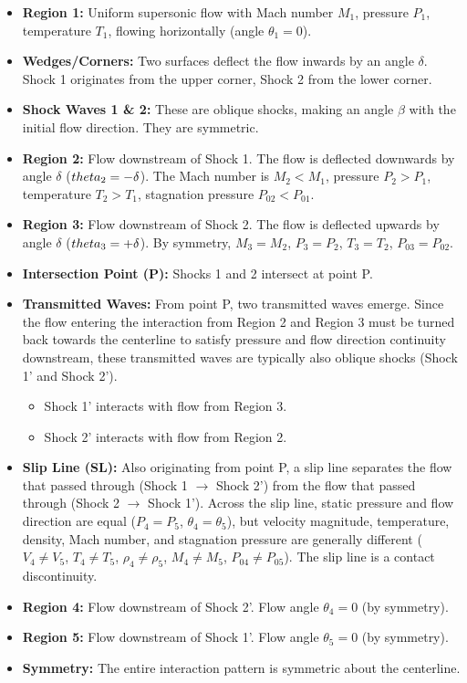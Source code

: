 \begin{itemize}
\tightlist
\item
  \textbf{Region 1:} Uniform supersonic flow with Mach number \(M_1\),
  pressure \(P_1\), temperature \(T_1\), flowing horizontally (angle
  \(\theta_1 = 0\)).
\item
  \textbf{Wedges/Corners:} Two surfaces deflect the flow inwards by an
  angle \(\delta\). Shock 1 originates from the upper corner, Shock 2
  from the lower corner.
\item
  \textbf{Shock Waves 1 \& 2:} These are oblique shocks, making an angle
  \(\beta\) with the initial flow direction. They are symmetric.
\item
  \textbf{Region 2:} Flow downstream of Shock 1. The flow is deflected
  downwards by angle \(\delta\) (\(\\theta_2 = -\delta\)). The Mach
  number is \(M_2 < M_1\), pressure \(P_2 > P_1\), temperature
  \(T_2 > T_1\), stagnation pressure \(P_{02} < P_{01}\).
\item
  \textbf{Region 3:} Flow downstream of Shock 2. The flow is deflected
  upwards by angle \(\delta\) (\(\\theta_3 = +\delta\)). By symmetry,
  \(M_3 = M_2\), \(P_3 = P_2\), \(T_3 = T_2\), \(P_{03} = P_{02}\).
\item
  \textbf{Intersection Point (P):} Shocks 1 and 2 intersect at point P.
\item
  \textbf{Transmitted Waves:} From point P, two transmitted waves
  emerge. Since the flow entering the interaction from Region 2 and
  Region 3 must be turned back towards the centerline to satisfy
  pressure and flow direction continuity downstream, these transmitted
  waves are typically also oblique shocks (Shock 1' and Shock 2').

  \begin{itemize}
  \tightlist
  \item
    Shock 1' interacts with flow from Region 3.
  \item
    Shock 2' interacts with flow from Region 2.
  \end{itemize}
\item
  \textbf{Slip Line (SL):} Also originating from point P, a slip line
  separates the flow that passed through (Shock 1 \(\to\) Shock 2') from
  the flow that passed through (Shock 2 \(\to\) Shock 1'). Across the
  slip line, static pressure and flow direction are equal
  (\(P_4 = P_5\), \(\theta_4 = \theta_5\)), but velocity magnitude,
  temperature, density, Mach number, and stagnation pressure are
  generally different (\(V_4 \neq V_5\), \(T_4 \neq T_5\),
  \(\rho_4 \neq \rho_5\), \(M_4 \neq M_5\), \(P_{04} \neq P_{05}\)). The
  slip line is a contact discontinuity.
\item
  \textbf{Region 4:} Flow downstream of Shock 2'. Flow angle
  \(\theta_4 = 0\) (by symmetry).
\item
  \textbf{Region 5:} Flow downstream of Shock 1'. Flow angle
  \(\theta_5 = 0\) (by symmetry).
\item
  \textbf{Symmetry:} The entire interaction pattern is symmetric about
  the centerline.
\end{itemize}

